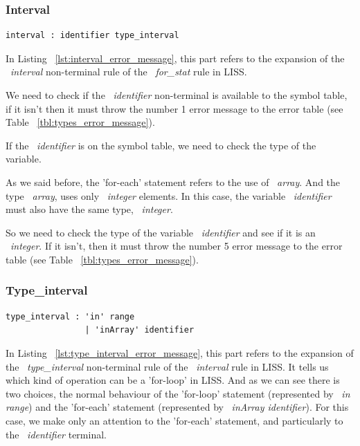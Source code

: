 \documentclass[
  oneside,
  11pt, a4paper,
  footinclude=true,
  headinclude=true,
  cleardoublepage=empty
]{scrbook}
\begin{document}
\subsubsection{Interval}

\begin{lstlisting}[caption={Interval rule in LISS},label={lst:interval_error_message}]
  interval : identifier type_interval
\end{lstlisting}

In Listing ~\ref{lst:interval_error_message}, this part refers to the expansion of the ~\textit{interval} non-terminal rule of the ~\textit{for\_stat} rule in LISS.

We need to check if the ~\textit{identifier} non-terminal is available to the symbol table, if it isn't then it must throw the number 1 error message to the error table (see Table ~\ref{tbl:types_error_message}).

If the ~\textit{identifier} is on the symbol table, we need to check the type of the variable.

As we said before, the 'for-each' statement refers to the use of ~\textit{array}. And the type ~\textit{array}, uses only ~\textit{integer} elements. In this case, the variable ~\textit{identifier} must also have the same type, ~\textit{integer}.

So we need to check the type of the variable ~\textit{identifier} and see if it is an ~\textit{integer}.
If it isn't, then it must throw the number 5 error message to the error table (see Table ~\ref{tbl:types_error_message}).

\subsubsection{Type\_interval}

\begin{lstlisting}[caption={Type\_interval rule in LISS},label={lst:type_interval_error_message}]
  type_interval : 'in' range
                | 'inArray' identifier
\end{lstlisting}

In Listing ~\ref{lst:type_interval_error_message}, this part refers to the expansion of the ~\textit{type\_interval} non-terminal rule of the ~\textit{interval} rule in LISS. It tells us which kind of operation can be a 'for-loop' in LISS.
And as we can see there is two choices, the normal behaviour of the 'for-loop' statement (represented by ~\textit{in range}) and the 'for-each' statement (represented by ~\textit{inArray identifier}).
For this case, we make only an attention to the 'for-each' statement, and particularly to the ~\textit{identifier} terminal.
\end{document}
